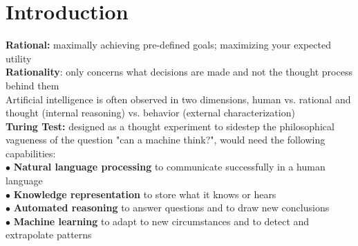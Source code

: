\section{Introduction}

    \textbf{Rational:} maximally achieving pre-defined goals; maximizing your expected utility \\
    \textbf{Rationality}: only concerns what decisions are made and not the thought process behind them \\

    Artificial intelligence is often observed in two dimensions, human vs. rational and thought (internal reasoning) vs. behavior (external characterization) \\

    \textbf{Turing Test:} designed as a thought experiment to sidestep the philosophical vagueness of the question "can a machine think?", would need the following capabilities: \\
    $\bullet$ \textbf{Natural language processing} to communicate successfully in a human language \\
    $\bullet$ \textbf{Knowledge representation} to store what it knows or hears \\
    $\bullet$ \textbf{Automated reasoning} to answer questions and to draw new conclusions \\
    $\bullet$ \textbf{Machine learning} to adapt to new circumstances and to detect and extrapolate patterns \\

